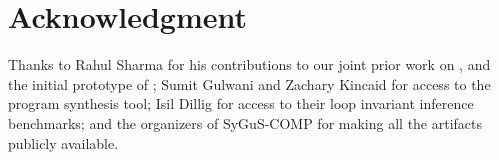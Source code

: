 \documentclass[conference]{IEEEtran}
\begin{document}
\section*{Acknowledgment}

\noindent
Thanks to Rahul Sharma for his contributions to our joint prior work on \PIE, and the initial prototype of \LoopInvGen;
Sumit Gulwani and Zachary Kincaid for access to the  program synthesis tool;
Isil Dillig for access to their loop invariant inference benchmarks;
and the organizers of SyGuS-COMP for making all the artifacts publicly available.






\end{document}

